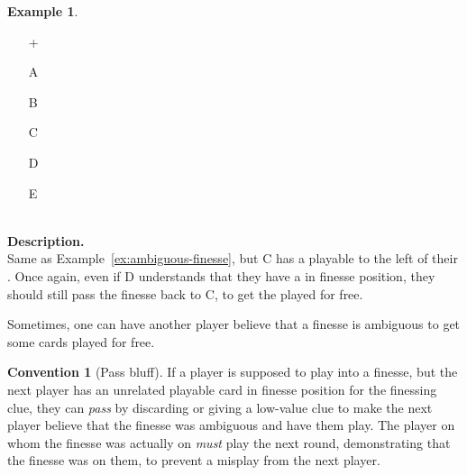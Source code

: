 \documentclass[a4paper]{article}
\theoremstyle{plain}
\theoremstyle{definition}
\newtheorem{example}[theorem]{Example}
\newtheorem{convention}[theorem]{Convention}
\begin{document}
\begin{example}	\hfill \\
	\label{ex:layered-ambiguous-finesse}
	\begin{minipage}{0.45\textwidth}
		\begin{itemize}
			\item[\Large +]      
			\item[\Large A]    
			\item[\Large B]    
			\item[\Large C]     
			\item[\Large D]    
			\item[\Large E]    
		\end{itemize}
	\end{minipage}%
	\begin{minipage}{0.55\textwidth}
		\hfill \\
		
		\textbf{Description.} \\
		
		Same as Example~\ref{ex:ambiguous-finesse}, but C has a playable  to the left of their . Once again, even if D understands that they have a  in finesse position, they should still pass the finesse back to C, to get the  played for free.
	\end{minipage}
\end{example} \vspace{0.15 cm}

Sometimes, one can have another player believe that a finesse is ambiguous to get some cards played for free.

\begin{convention}[Pass bluff]
	If a player is supposed to play into a finesse, but the next player has an unrelated playable card in finesse position for the finessing clue, they can \emph{pass} by discarding or giving a low-value clue to make the next player believe that the finesse was ambiguous and have them play. The player on whom the finesse was actually on \emph{must} play the next round, demonstrating that the finesse was on them, to prevent a misplay from the next player.
\end{convention}
\end{document}
